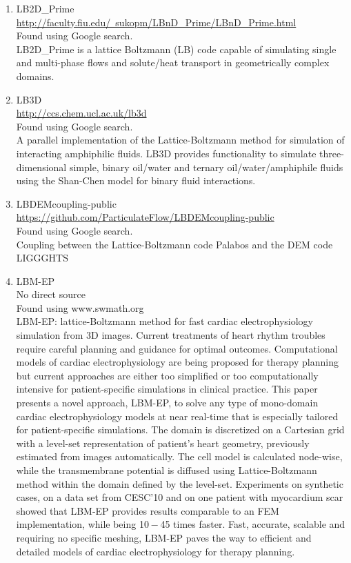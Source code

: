 \documentclass{article}
\begin{document}
\begin{enumerate}
	\item LB2D\_Prime
	\\
	\href{http://faculty.fiu.edu/~sukopm/LBnD_Prime/LBnD_Prime.html}{http://faculty.fiu.edu/~sukopm/LBnD\_Prime/LBnD\_Prime.html} \\
	Found using Google search.\\
	LB2D\_Prime is a lattice Boltzmann (LB) code capable of simulating single and multi-phase flows and solute/heat transport in geometrically complex domains.
	
	\item LB3D \\ 
	\href{http://ccs.chem.ucl.ac.uk/lb3d}{http://ccs.chem.ucl.ac.uk/lb3d}
	\\
	Found using Google search.\\
	A parallel implementation of the Lattice-Boltzmann method for simulation of interacting amphiphilic fluids. LB3D provides functionality to simulate three-dimensional simple, binary oil/water and ternary oil/water/amphiphile fluids using the Shan-Chen model for binary fluid interactions.
	
	\item LBDEMcoupling-public
	\\
	\href{https://github.com/ParticulateFlow/LBDEMcoupling-public}{https://github.com/ParticulateFlow/LBDEMcoupling-public}
	\\
	Found using Google search.\\
	Coupling between the Lattice-Boltzmann code Palabos and the DEM code LIGGGHTS
	
	\item LBM-EP \\
	No direct source\\
	Found using www.swmath.org \\	
	LBM-EP: lattice-Boltzmann method for fast cardiac electrophysiology simulation from 3D images. Current treatments of heart rhythm troubles require careful planning and guidance for optimal outcomes. Computational models of cardiac electrophysiology are being proposed for therapy planning but current approaches are either too simplified or too computationally intensive for patient-specific simulations in clinical practice. This paper presents a novel approach, LBM-EP, to solve any type of mono-domain cardiac electrophysiology models at near real-time that is especially tailored for patient-specific simulations. The domain is discretized on a Cartesian grid with a level-set representation of patient’s heart geometry, previously estimated from images automatically. The cell model is calculated node-wise, while the transmembrane potential is diffused using Lattice-Boltzmann method within the domain defined by the level-set. Experiments on synthetic cases, on a data set from CESC’10 and on one patient with myocardium scar showed that LBM-EP provides results comparable to an FEM implementation, while being 10 − 45 times faster. Fast, accurate, scalable and requiring no specific meshing, LBM-EP paves the way to efficient and detailed models of cardiac electrophysiology for therapy planning. 
	

\end{enumerate}
\end{document}
